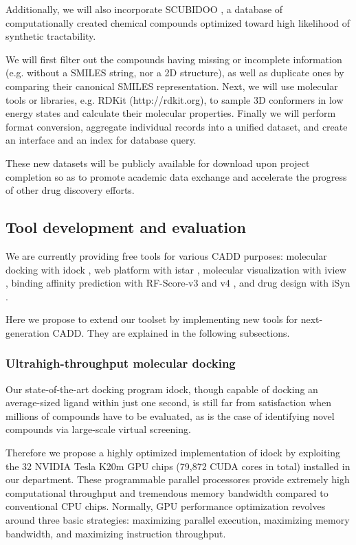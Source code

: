 \documentclass[a4paper,12pt]{article}
\begin{document}
Additionally, we will also incorporate SCUBIDOO \cite{1682}, a database of computationally created chemical compounds optimized toward high likelihood of synthetic tractability. 

We will first filter out the compounds having missing or incomplete information (e.g. without a SMILES string, nor a 2D structure), as well as duplicate ones by comparing their canonical SMILES representation. Next, we will use molecular tools or libraries, e.g. RDKit (http://rdkit.org), to sample 3D conformers in low energy states and calculate their molecular properties. Finally we will perform format conversion, aggregate individual records into a unified dataset, and create an interface and an index for database query.

These new datasets will be publicly available for download upon project completion so as to promote academic data exchange and accelerate the progress of other drug discovery efforts.

\subsection*{Tool development and evaluation}

We are currently providing free tools for various CADD purposes: molecular docking with idock \cite{1153}, web platform with istar \cite{1362}, molecular visualization with iview \cite{1366,1265}, binding affinity prediction with RF-Score-v3 and v4 \cite{1432,1647,1434,1663}, and drug design with iSyn \cite{1409,1387}.

Here we propose to extend our toolset by implementing new tools for next-generation CADD. They are explained in the following subsections.

\subsubsection*{Ultrahigh-throughput molecular docking}

Our state-of-the-art docking program idock, though capable of docking an average-sized ligand within just one second, is still far from satisfaction when millions of compounds have to be evaluated, as is the case of identifying novel compounds via large-scale virtual screening.

Therefore we propose a highly optimized implementation of idock by exploiting the 32 NVIDIA Tesla K20m GPU chips (79,872 CUDA cores in total) installed in our department. These programmable parallel processores provide extremely high computational throughput and tremendous memory bandwidth compared to conventional CPU chips. Normally, GPU performance optimization revolves around three basic strategies: maximizing parallel execution, maximizing memory bandwidth, and maximizing instruction throughput.
\end{document}
